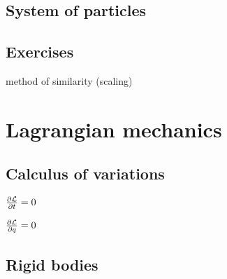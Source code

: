\documentclass{../../large}
\begin{document}
\section{System of particles}
\begin{prb}
\end{prb}
\begin{prb}[Collisions]
\end{prb}
\begin{prb}
\end{prb}
\begin{prb}
\end{prb}

\section*{Exercises}
method of similarity (scaling)



\chapter{Lagrangian mechanics}
\section{Calculus of variations}
\begin{prb}
\end{prb}
\begin{prb}
$\pd{\cL}{t}=0$
\end{prb}
\begin{prb}
$\pd{\cL}{q}=0$
\end{prb}
\begin{prb}
\end{prb}
\section{Rigid bodies}
\begin{prb}
\end{prb}
\begin{prb}
\end{prb}
\begin{prb}
\end{prb}
\end{document}
